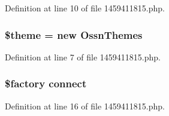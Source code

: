 Definition at line 10 of file 1459411815.\+php.

\subsubsection[{\texorpdfstring{\$theme}{$theme}}]{\setlength{\rightskip}{0pt plus 5cm}\$theme = new {\bf Ossn\+Themes}}\hypertarget{1459411815_8php_a1ae541f7fe1c5e21cb4535f88ec9e9dc}{}\label{1459411815_8php_a1ae541f7fe1c5e21cb4535f88ec9e9dc}


Definition at line 7 of file 1459411815.\+php.

\subsubsection[{\texorpdfstring{connect}{connect}}]{\setlength{\rightskip}{0pt plus 5cm}\$factory connect}\hypertarget{1459411815_8php_a3fdbedd7713e458f25fcf7dc1f562a3d}{}\label{1459411815_8php_a3fdbedd7713e458f25fcf7dc1f562a3d}


Definition at line 16 of file 1459411815.\+php.


